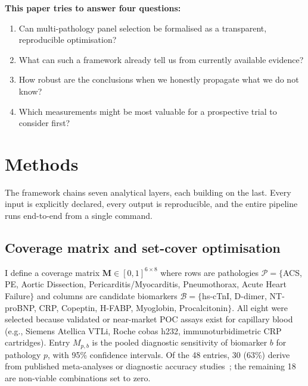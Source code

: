 \documentclass[11pt, oneside]{article}
\begin{document}
\textbf{This paper tries to answer four questions:}
\begin{enumerate}
\item Can multi-pathology panel selection be formalised as a transparent, reproducible optimisation?
\item What can such a framework already tell us from currently available evidence?
\item How robust are the conclusions when we honestly propagate what we do not know?
\item Which measurements might be most valuable for a prospective trial to consider first?
\end{enumerate}


\section{Methods}
\label{sec:methods}

The framework chains seven analytical layers, each building on the last. Every input is explicitly declared, every output is reproducible, and the entire pipeline runs end-to-end from a single command.

\subsection{Coverage matrix and set-cover optimisation}

I define a coverage matrix $\mathbf{M} \in [0,1]^{6 \times 8}$ where rows are pathologies $\mathcal{P} = \{$ACS, PE, Aortic Dissection, Pericarditis/Myocarditis, Pneumothorax, Acute Heart Failure$\}$ and columns are candidate biomarkers $\mathcal{B} = \{$hs-cTnI, D-dimer, NT-proBNP, CRP, Copeptin, H-FABP, Myoglobin, Procalcitonin$\}$. All eight were selected because validated or near-market POC assays exist for capillary blood (e.g., Siemens Atellica VTLi, Roche cobas h232, immunoturbidimetric CRP cartridges). Entry $M_{p,b}$ is the pooled diagnostic sensitivity of biomarker $b$ for pathology $p$, with 95\% confidence intervals. Of the 48 entries, 30 (63\%) derive from published meta-analyses or diagnostic accuracy studies~\cite{Lipinski2015,Geersing2012,Maisel2002,Nazerian2014,Keller2011,Raskovalova2013,Body2015,Imazio2011,Crawford2019}; the remaining 18 are non-viable combinations set to zero.
\end{document}
